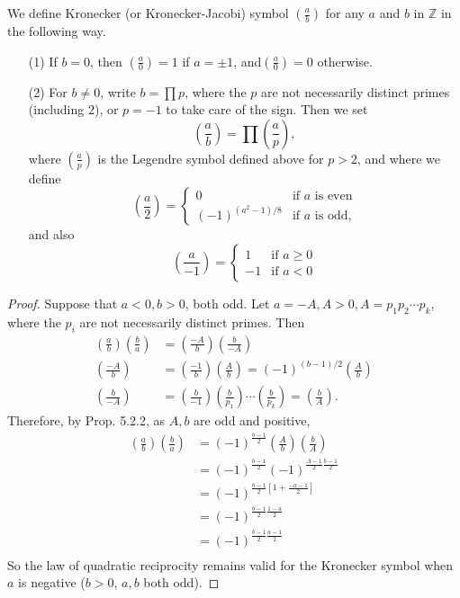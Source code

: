 \documentclass[11pt,a4paper]{article}
\newcommand{\Z}{\mathbb{Z}}
\newcommand{\legendre}[2]{\genfrac{(}{)}{}{}{#1}{#2}}
\begin{document}
We define Kronecker (or Kronecker-Jacobi) symbol $\legendre{a}{b}$ for any $a$ and $b$ in $\Z$ in the following way.
\begin{enumerate}
\item[(1)] If $b=0$, then $\legendre{a}{0} = 1$ if $a = \pm 1$, and$\legendre{a}{0} = 0$ otherwise.

\item[(2)] For $b \ne 0$, write $b = \prod p$, where the $p$ are not necessarily distinct primes (including $2$), or $p = -1$ to take care of the sign. Then we set
$$\legendre{a}{b} = \prod \legendre{a}{p},$$
where $\legendre{a}{p}$ is the Legendre symbol defined above for $p>2$, and where we define
$$\legendre{a}{2} = 
\begin{cases}
0 & \text{if $a$ is even}\\
(-1)^{(a^2-1)/8} &\text{if $a$ is odd,}
\end{cases}
$$
and also
$$\legendre{a}{-1} = 
\begin{cases}
1 & \text{if $a\geq 0$}\\
-1 & \text{if $a<0$}
\end{cases}
$$
\end{enumerate}
\begin{proof} 
Suppose that $a <0, b>0$, both odd. Let $a = -A,A>0, A = p_1p_2\cdots p_k$, where the $p_i$ are not necessarily distinct primes. Then
\begin{align*}
\legendre{a}{b}\legendre{b}{a} &= \legendre{-A}{b}\legendre{b}{-A} \\
\legendre{-A}{b} &= \legendre{-1}{b} \legendre{A}{b} 
=(-1)^{(b-1)/2} \legendre{A}{b}\\
\legendre{b}{-A} &= \legendre{b}{-1} \legendre{b}{p_1}\cdots \legendre{b}{p_k}
= \legendre{b}{A}.
\end{align*}
Therefore, by Prop. 5.2.2, as $A,b$ are odd and positive,
\begin{align*}
\legendre{a}{b}\legendre{b}{a} &= (-1)^{ \frac{b-1}{2} } \legendre{A}{b} \legendre{b}{A}\\
&=(-1)^{ \frac{b-1}{2} } (-1)^{\frac{A-1}{2}\frac{b-1}{2}}\\
&=(-1) ^{\frac{b-1}{2} [1 + \frac{-a-1}{2}]}\\
&=(-1)^{\frac{b-1}{2}\frac{1-a}{2} }\\
&=(-1)^{\frac{b-1}{2}\frac{a-1}{2} }\\
\end{align*}
So the law of quadratic reciprocity remains valid for the Kronecker symbol when $a$ is negative ($b>0$, $a,b$ both odd).
\end{proof}
\end{document}
